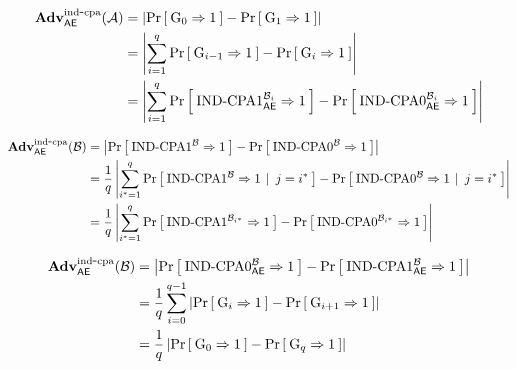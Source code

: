 

\begin{align*}
\AdvINDCPA{\AEnc}{\advA} 
  &= \left|\Prob{\G_0\Rightarrow1} - \Prob{\G_1\Rightarrow1}\right|\\
  &= \left|\sum_{i=1}^q \Prob{\G_{i-1}\Rightarrow1} - \Prob{\G_i\Rightarrow1}\right| \\
  &= \left|\sum_{i=1}^q 
      \Prob{\INDCPA1^{\advB_i}_\AEnc\Rightarrow 1}
      - \Prob{\INDCPA0^{\advB_i}_\AEnc\Rightarrow 1}\right|
\end{align*}

\begin{align*}
  \AdvINDCPA{\AEnc}{\advB}
    &= \left| \Prob{\INDCPA1^\advB\Rightarrow1} - \Prob{\INDCPA0^\advB\Rightarrow1} \right|\\
    &= \frac{1}{q} \left|
    \sum_{i^*=1}^q\CondProb{\INDCPA1^\advB\Rightarrow1}{j= i^*} -
    \CondProb{\INDCPA0^\advB\Rightarrow1}{j=i^*} \right|\\
    &= \frac{1}{q} \left|
    \sum_{i^*=1}^q\Prob{\INDCPA1^{\advB_{i^*}}\Rightarrow1} - \Prob{\INDCPA0^{\advB_{i^*}}\Rightarrow1} \right|
\end{align*}
  

\begin{align*}
\AdvINDCPA{\AEnc}{\advB} 
  &= \left|\Prob{\INDCPA0_\AEnc^\advB\Rightarrow1} -
                      \Prob{\INDCPA1_\AEnc^\advB\Rightarrow1}\right|\\
  &= \frac{1}{q}\sum_{i=0}^{q-1} \left|\Prob{\G_i\Rightarrow1} - \Prob{\G_{i+1}\Rightarrow1}\right|\\
  &= \frac{1}{q}\left|\Prob{\G_0\Rightarrow1} - \Prob{\G_q\Rightarrow1}\right|
\end{align*}


